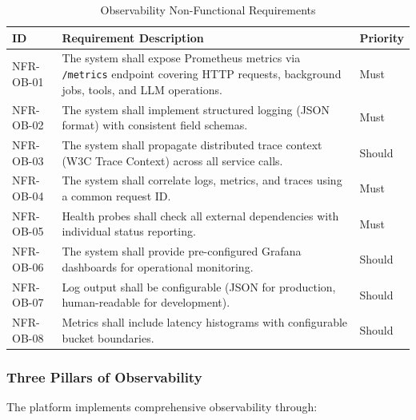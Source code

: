 \documentclass[a4paper,twoside]{sapthesis}
\begin{document}
\begin{table}[htbp]
\centering
\caption{Observability Non-Functional Requirements}
\label{tab:nfr-observability}
\small
\begin{tabularx}{\textwidth}{|l|X|l|}
\hline
\textbf{ID} & \textbf{Requirement Description} & \textbf{Priority} \\
\midrule
NFR-OB-01 & The system shall expose Prometheus metrics via \texttt{/metrics} endpoint covering HTTP requests, background jobs, tools, and LLM operations. & Must \\
\midrule
NFR-OB-02 & The system shall implement structured logging (JSON format) with consistent field schemas. & Must \\
\midrule
NFR-OB-03 & The system shall propagate distributed trace context (W3C Trace Context) across all service calls. & Should \\
\midrule
NFR-OB-04 & The system shall correlate logs, metrics, and traces using a common request ID. & Must \\
\midrule
NFR-OB-05 & Health probes shall check all external dependencies with individual status reporting. & Must \\
\midrule
NFR-OB-06 & The system shall provide pre-configured Grafana dashboards for operational monitoring. & Should \\
\midrule
NFR-OB-07 & Log output shall be configurable (JSON for production, human-readable for development). & Should \\
\midrule
NFR-OB-08 & Metrics shall include latency histograms with configurable bucket boundaries. & Should \\
\midrule
\end{tabularx}
\end{table}

\subsubsection{Three Pillars of Observability}

The platform implements comprehensive observability through:
\end{document}
